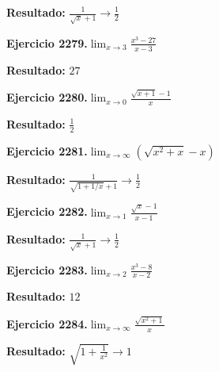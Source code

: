 \documentclass[10pt,a4paper]{article}
\begin{document}
\begin{solbox}
\textbf{Resultado:} \(\displaystyle \frac{1}{\sqrt{x}+1} \to \frac{1}{2}\)
\end{solbox}

\newpage
\begin{ejbox}
\textbf{Ejercicio 2279.}\quad $\lim_{x\to 3} \frac{x^3-27}{x-3}$
\end{ejbox}

\begin{solbox}
\textbf{Resultado:} \(\displaystyle 27\)
\end{solbox}

\begin{ejbox}
\textbf{Ejercicio 2280.}\quad $\lim_{x\to 0} \frac{\sqrt{x+1}-1}{x}$
\end{ejbox}

\begin{solbox}
\textbf{Resultado:} \(\displaystyle \frac{1}{2}\)
\end{solbox}

\begin{ejbox}
\textbf{Ejercicio 2281.}\quad $\lim_{x\to \infty} (\sqrt{x^2+x} - x)$
\end{ejbox}

\begin{solbox}
\textbf{Resultado:} \(\displaystyle \frac{1}{\sqrt{1+1/x}+1} \to \frac{1}{2}\)
\end{solbox}

\newpage
\begin{ejbox}
\textbf{Ejercicio 2282.}\quad $\lim_{x\to 1} \frac{\sqrt{x}-1}{x-1}$
\end{ejbox}

\begin{solbox}
\textbf{Resultado:} \(\displaystyle \frac{1}{\sqrt{x}+1} \to \frac{1}{2}\)
\end{solbox}

\begin{ejbox}
\textbf{Ejercicio 2283.}\quad $\lim_{x\to 2} \frac{x^3-8}{x-2}$
\end{ejbox}

\begin{solbox}
\textbf{Resultado:} \(\displaystyle 12\)
\end{solbox}

\begin{ejbox}
\textbf{Ejercicio 2284.}\quad $\lim_{x\to \infty} \frac{\sqrt{x^2+1}}{x}$
\end{ejbox}

\begin{solbox}
\textbf{Resultado:} \(\displaystyle \sqrt{1+\frac{1}{x^2}} \to 1\)
\end{solbox}
\end{document}

